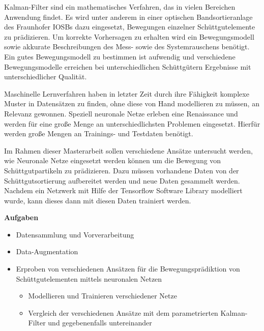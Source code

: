 \documentclass [a4paper, 10pt]{scrartcl}
\begin{document}
\Anfang
Kalman-Filter sind ein mathematisches Verfahren, das in vielen Bereichen Anwendung findet. 
Es wird unter anderem in einer optischen Bandsortieranlage des Fraunhofer IOSBs dazu eingesetzt, Bewegungen einzelner Schüttgutelemente zu prädizieren.
Um korrekte Vorhersagen zu erhalten wird ein Bewegungsmodell sowie akkurate Beschreibungen des Mess- sowie des Systemrauschens benötigt.
Ein gutes Bewegungsmodell zu bestimmen ist aufwendig und verschiedene Bewegungsmodelle erreichen bei unterschiedlichen Schüttgütern Ergebnisse mit unterschiedlicher Qualität.


Maschinelle Lernverfahren haben in letzter Zeit durch ihre Fähigkeit 
komplexe Muster in Datensätzen zu finden, ohne diese von Hand modellieren zu müssen, an Relevanz gewonnen.
Speziell neuronale Netze erleben eine Renaissance und werden für eine große Menge an unterschiedlichsten Problemen eingesetzt.
Hierfür werden große Mengen an Trainings- und Testdaten benötigt. 

Im Rahmen dieser Masterarbeit sollen verschiedene Ansätze untersucht werden, wie Neuronale Netze eingesetzt werden können um die Bewegung von Schüttgutpartikeln zu prädizieren.
Dazu müssen vorhandene Daten von der Schüttgutsortierung aufbereitet werden und neue Daten gesammelt werden.
Nachdem ein Netzwerk mit Hilfe der Tensorflow Software Library modelliert wurde, kann dieses dann mit diesen Daten trainiert werden.





\textbf{Aufgaben}
\begin{itemize}
  \item Datensammlung und Vorverarbeitung
  \item Data-Augmentation
  \item Erproben von verschiedenen Ansätzen für die Bewegungsprädiktion von Schüttgutelementen mittels neuronalen Netzen
  	\begin{itemize}
  		\item Modellieren und Trainieren verschiedener Netze
  		\item Vergleich der verschiedenen Ansätze mit dem parametrierten Kalman-Filter und gegebenenfalls untereinander
  	\end{itemize}
\end{itemize}
\Ende
\end{document}
